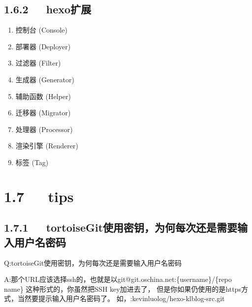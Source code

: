 \documentclass[letterpaper,12pt,english]{sphinxmanual}
\begin{document}
\subsection{1.6.2   hexo扩展}
\label{\detokenize{001software/001install/001._u7f51_u7ad9/hexo:id17}}\begin{enumerate}
%
\item {} 
控制台 (Console)

\item {} 
部署器 (Deployer)

\item {} 
过滤器 (Filter)

\item {} 
生成器 (Generator)

\item {} 
辅助函数 (Helper)

\item {} 
迁移器 (Migrator)

\item {} 
处理器 (Processor)

\item {} 
渲染引擎 (Renderer)

\item {} 
标签 (Tag)

\end{enumerate}


\section{1.7   tips}
\label{\detokenize{001software/001install/001._u7f51_u7ad9/hexo:tips}}

\subsection{1.7.1   tortoiseGit使用密钥，为何每次还是需要输入用户名密码}
\label{\detokenize{001software/001install/001._u7f51_u7ad9/hexo:tortoisegit}}

Q:tortoiseGit使用密钥，为何每次还是需要输入用户名密码

A:那个URL应该选择ssh的，也就是以git@git.oschina.net:\{username\}/\{repo name\}
这种形式的，你虽然把SSH key加进去了，
但是你如果仍使用的是https方式，当然要提示输入用户名密码了。
如，:kevinluolog/hexo-klblog-src.git
\end{document}
